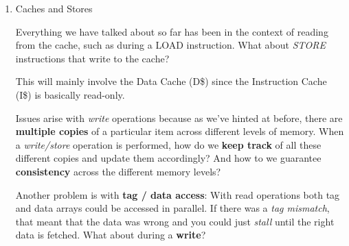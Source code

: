\documentclass[12pt]{article}
\newenvironment{QandA}{\begin{enumerate}[label=\bfseries\arabic*.]\bfseries}
                      {\end{enumerate}}
\newenvironment{answered}{\par\quad\normalfont}{}
\begin{document}
\begin{QandA}
\begin{answered}
\textbf{Replacement Policies}

With N-Way Associative Caches, what happens during a \textit{Cache Miss}? Which block in a set should be evicted?
\begin{itemize}
    \item Random
    \item FIFO
    \item \textbf{Least Recently Used (LRU)} : works well in practice. Requires additional \textbf{LRU bits} - for a 2-Way Set Associative cache, this is just a single bit.
    \item Not Most Recently Used (NMRU) : approximation of LRU, easier to implement
    \item Belady's : replace what will be used furthest in the future - impractical but good for simulation and pre-recorded traces 
\end{itemize}

\textit{Q: What is the impact of associativity on \textbf{performance}?}

\quad With higher associative caches, you will have a lower $\%_{misses}$, but at a certain point you will have diminishing returns because $t_{access}$ will increase. 

\textit{Q: Does associativity need to be powers of 2?}

\quad No it does not!
\end{answered}

\ 

\item Caches and Stores
\begin{answered}
Everything we have talked about so far has been in the context of reading from the cache, such as during a LOAD instruction. What about \textit{STORE} instructions that write to the cache?

\quad This will mainly involve the Data Cache (D\$) since the Instruction Cache (I\$) is basically read-only. 

\quad Issues arise with \textit{write} operations because as we've hinted at before, there are \textbf{multiple copies} of a particular item across different levels of memory. When a \textit{write/store} operation is performed, how do we \textbf{keep track} of all these different copies and update them accordingly? And how to we guarantee \textbf{consistency} across the different memory levels?

\quad Another problem is with \textbf{tag / data access}: With read operations both tag and data arrays could be accessed in parallel. If there was a \textit{tag mismatch}, that meant that the data was wrong and you could just \textit{stall} until the right data is fetched. What about during a \textbf{write}?


\end{answered}
\end{QandA}
\end{document}
